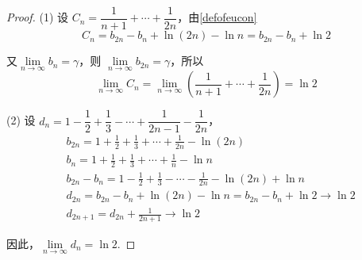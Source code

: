 \begin{proof}
	(1) 设 $C_n = \dfrac{1}{n+1} + \cdots + \dfrac{1}{2n}$，由\ref{defofeucon}
	\[
	C_n = b_{2n} - b_n + \ln(2n) - \ln n = b_{2n} - b_n + \ln 2
	\]
	
	又$\lim\limits_{n \to \infty} b_n = \gamma$，则 $\lim\limits_{n \to \infty} b_{2n} = \gamma$，所以
	\[
	\lim_{n \to \infty} C_n = \lim_{n \to \infty} \left(\frac{1}{n+1} + \cdots + \frac{1}{2n}\right) = \ln 2
	\]
	
	(2) 设 $d_n = 1 - \dfrac{1}{2} + \dfrac{1}{3} - \cdots + \dfrac{1}{2n-1} - \dfrac{1}{2n}$，
	$$\begin{aligned}
		&	b_{2n} = 1 + \frac{1}{2} + \frac{1}{3} + \cdots + \frac{1}{2n} - \ln(2n)\\
		&	b_n = 1 + \frac{1}{2} + \frac{1}{3} + \cdots + \frac{1}{n} - \ln n\\
		&b_{2n} - b_n = 1 - \frac{1}{2} + \frac{1}{3} - \cdots - \frac{1}{2n} - \ln(2n) + \ln n\\
		&d_{2n} = b_{2n} - b_n + \ln(2n) - \ln n = b_{2n} - b_n + \ln 2 \to \ln 2\\
		&d_{2n+1} = d_{2n} + \frac{1}{2n+1} \to \ln 2
	\end{aligned}$$
	
	因此，$\lim\limits_{n \to \infty} d_n = \ln 2$.
	
\end{proof}
